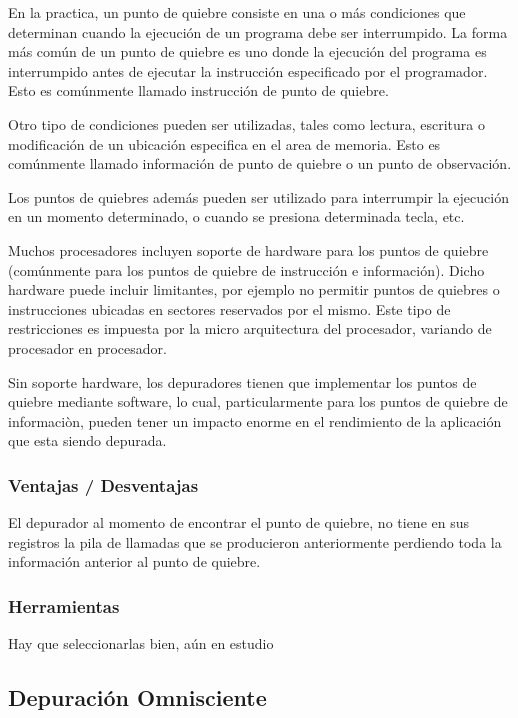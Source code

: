 \documentclass[12pt,a4paper]{report}
\begin{document}
En la practica, un punto de quiebre consiste en una o más condiciones que determinan cuando la ejecución de un programa debe ser interrumpido.  La forma más común de un punto de quiebre es uno donde la ejecución del programa es interrumpido antes de ejecutar la instrucción especificado por el programador.  Esto es comúnmente llamado instrucción de punto de quiebre.

Otro tipo de condiciones pueden ser utilizadas, tales como lectura, escritura o modificación de un ubicación especifica en el area de memoria.  Esto es comúnmente llamado información de punto de quiebre o un punto de observación.

Los puntos de quiebres además pueden ser utilizado para interrumpir la ejecución en un momento determinado, o cuando se presiona determinada tecla, etc.

Muchos procesadores incluyen soporte de hardware para los puntos de quiebre (comúnmente para los puntos de quiebre de instrucción e información).  Dicho hardware puede incluir limitantes, por ejemplo no permitir puntos de quiebres o instrucciones ubicadas en sectores reservados por el mismo.  Este tipo de restricciones es impuesta por la micro arquitectura del procesador, variando de procesador en procesador.

Sin soporte hardware, los depuradores tienen que implementar los puntos de quiebre mediante software, lo cual, particularmente para los puntos de quiebre de informaciòn, pueden tener un impacto enorme en el rendimiento de la aplicación que esta siendo depurada.


			\subsubsection{Ventajas / Desventajas}

El depurador al momento de encontrar el punto de quiebre, no tiene en sus registros la pila de llamadas que se producieron anteriormente perdiendo toda la información anterior al punto de quiebre.

			\subsubsection{Herramientas}

Hay que seleccionarlas bien, aún en estudio

		\subsection{Depuración Omnisciente}
\end{document}
